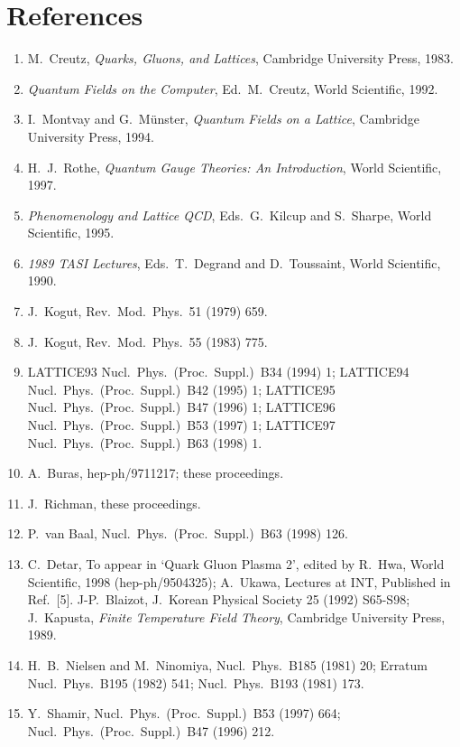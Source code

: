 \chapter*{References}

\begin{enumerate}
\renewcommand{\labelenumi}{[\arabic{enumi}]}
\item M.~Creutz, \textit{Quarks, Gluons, and Lattices}, Cambridge University Press, 1983.
\item \textit{Quantum Fields on the Computer}, Ed.~M.~Creutz, World Scientific, 1992.
\item I.~Montvay and G.~M\"unster, \textit{Quantum Fields on a Lattice}, Cambridge University Press, 1994.
\item H.~J.~Rothe, \textit{Quantum Gauge Theories: An Introduction}, World Scientific, 1997.
\item \textit{Phenomenology and Lattice QCD}, Eds.~G.~Kilcup and S.~Sharpe, World Scientific, 1995.
\item \textit{1989 TASI Lectures}, Eds.~T.~Degrand and D.~Toussaint, World Scientific, 1990.
\item J.~Kogut, Rev.\ Mod.\ Phys.\ 51 (1979) 659.
\item J.~Kogut, Rev.\ Mod.\ Phys.\ 55 (1983) 775.
\item LATTICE93 Nucl.\ Phys.\ (Proc.\ Suppl.)\ B34 (1994) 1; LATTICE94 Nucl.\ Phys.\ (Proc.\ Suppl.)\ B42 (1995) 1; LATTICE95 Nucl.\ Phys.\ (Proc.\ Suppl.)\ B47 (1996) 1; LATTICE96 Nucl.\ Phys.\ (Proc.\ Suppl.)\ B53 (1997) 1; LATTICE97 Nucl.\ Phys.\ (Proc.\ Suppl.)\ B63 (1998) 1.
\item A.~Buras, hep-ph/9711217; these proceedings.
\item J.~Richman, these proceedings.
\item P.~van Baal, Nucl.\ Phys.\ (Proc.\ Suppl.)\ B63 (1998) 126.
\item C.~Detar, To appear in `Quark Gluon Plasma 2', edited by R.~Hwa, World Scientific, 1998 (hep-ph/9504325); A.~Ukawa, Lectures at INT, Published in Ref.~[5]. J-P.~Blaizot, J.~Korean Physical Society 25 (1992) S65-S98; J.~Kapusta, \textit{Finite Temperature Field Theory}, Cambridge University Press, 1989.
\item H.~B.~Nielsen and M.~Ninomiya, Nucl.\ Phys.\ B185 (1981) 20; Erratum Nucl.\ Phys.\ B195 (1982) 541; Nucl.\ Phys.\ B193 (1981) 173.
\item Y.~Shamir, Nucl.\ Phys.\ (Proc.\ Suppl.)\ B53 (1997) 664; Nucl.\ Phys.\ (Proc.\ Suppl.)\ B47 (1996) 212.

\end{enumerate}
